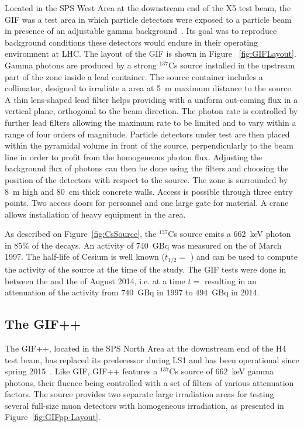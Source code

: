 	Located in the SPS West Area at the downstream end of the X5 test beam, the GIF was a test area in which particle detectors were exposed to a particle beam in presence of an adjustable gamma background~\cite{AGOSTEO1999}. Its goal was to reproduce background conditions these detectors would endure in their operating environment at LHC. The layout of the GIF is shown in Figure ~\ref{fig:GIFLayout}. Gamma photons are produced by a strong $^{137}$Cs source installed in the upstream part of the zone inside a lead container. The source container includes a collimator, designed to irradiate a  area at \SI{5}{m} maximum distance to the source. A thin lens-shaped lead filter helps providing with a uniform out-coming flux in a vertical plane, orthogonal to the beam direction. The photon rate is controlled by further lead filters allowing the maximum rate to be limited and to vary within a range of four orders of magnitude. Particle detectors under test are then placed within the pyramidal volume in front of the source, perpendicularly to the beam line in order to profit from the homogeneous photon flux. Adjusting the background flux of photons can then be done using the filters and choosing the position of the detectors with respect to the source. The zone is surrounded by \SI{8}{m} high and \SI{80}{cm} thick concrete walls. Access is possible through three entry points. Two access doors for personnel and one large gate for material. A crane allows installation of heavy equipment in the area.
	
\endgroup
			
	As described on Figure~\ref{fig:CsSource}, the $^{137}$Cs source emits a \SI{662}{keV} photon in 85\% of the decays. An activity of \SI{740}{GBq} was measured on the  of March 1997. The half-life of Cesium is well known ($t_{1/2}=$ ) and can be used to compute the activity of the source at the time of the study. The GIF tests were done in between the  and the  of August 2014, i.e. at a time $t=$  resulting in an attenuation of the activity from \SI{740}{GBq} in 1997 to \SI{494}{GBq} in 2014.
		
		\subsection{The \acl{GIF++}}
		\label{chapt5:ssec:GIF++}
		
	The GIF++, located in the SPS North Area at the downstream end of the H4 test beam, has replaced its predecessor during LS1 and has been operational since spring 2015~\cite{JAKEL2014}. Like GIF, GIF++ features a $^{137}$Cs source of \SI{662}{keV} gamma photons, their fluence being controlled with a set of filters of various attenuation factors. The source provides two separate large irradiation areas for testing several full-size muon detectors with homogeneous irradiation, as presented in Figure~\ref{fig:GIFpp-Layout}.
	
